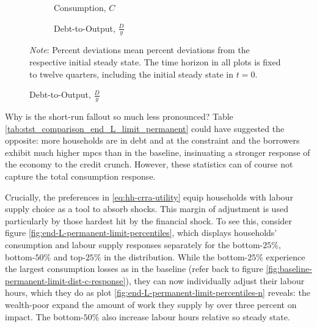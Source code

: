 \documentclass[a4paper,12pt]{article} %
\numberwithin{equation}{section} %
\numberwithin{figure}{section}
\numberwithin{table}{section}
\begin{document}
\begin{figure}[t]
    \centering
    \caption{Endogenous Labour Supply -- Shock to the Borrowing Limit: Aggregate Dynamics}
    \label{fig:comparison-end-labour-agg}
    \begin{subfigure}[b]{0.49\textwidth}
    \caption{Consumption, $C$}
    \label{fig:comparison-end-labour-c}
         \centering
         
     \end{subfigure}
     \hfill
    \begin{subfigure}[b]{0.49\textwidth}
    \caption{Debt-to-Output, $\frac{D}{y}$}
    \label{fig:comparison-end-labour-DY}
         \centering
         
     \end{subfigure}
     
     \vspace{10pt}
     
     \justifying
     \footnotesize
	\textit{Note}: Percent deviations mean percent deviations from the respective initial steady state. The time horizon in all plots is fixed to twelve quarters, including the initial steady state in $t=0$.
\end{figure}

Why is the short-run fallout so much less pronounced? Table \ref{tab:stst_comparison_end_L_limit_permanent} could have suggested the opposite: more households are in debt and at the constraint and the borrowers exhibit much higher \Gls{mpc}s than in the baseline, insinuating a stronger response of the economy to the credit crunch. However, these statistics can of course not capture the total consumption response. 

Crucially, the preferences in \eqref{eq:hh-crra-utility} equip households with labour supply choice as a tool to absorb shocks. This margin of adjustment is used particularly by those hardest hit by the financial shock. To see this, consider figure \ref{fig:end-L-permanent-limit-percentiles}, which displays households' consumption and labour supply responses separately for the bottom-$25\%$, bottom-$50\%$ and top-$25\%$ in the distribution. While the bottom-$25\%$ experience the largest consumption losses as in the baseline (refer back to figure \ref{fig:baseline-permanent-limit-dist-c-response}), they can now individually adjust their labour hours, which they do as plot \ref{fig:end-L-permanent-limit-percentiles-n} reveals: the wealth-poor expand the amount of work they supply by over three percent on impact. The bottom-$50\%$ also increase labour hours relative so steady state.
\end{document}
